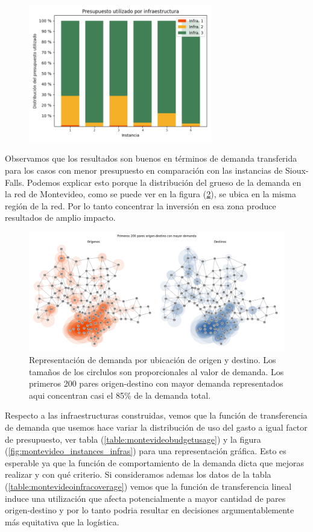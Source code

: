 \documentclass{article}
\begin{document}
  \begin{figure}[h!]
    \centering
    \includegraphics[width=8cm]{../resources/montevideo_budget_usage_by_infra.png}
      \caption{}
    \label{fig:montevideobudgetusage}
  \end{figure}

  Observamos que los resultados son buenos en términos de demanda transferida para los casos con menor presupuesto en comparación con las instancias de Sioux-Falls. Podemos explicar esto porque la distribución del grueso de la demanda en la red de Montevideo, como se puede ver en la figura (\ref{fig:montevideodemanddist}), se ubica en la misma región de la red. Por lo tanto concentrar la inversión en esa zona produce resultados de amplio impacto.

  \begin{figure}[h!]
    \centering
    \includegraphics[width=12cm]{../resources/montevideo_demands.png}
      \caption{Representación de demanda por ubicación de origen y destino. Los tamaños de los circlulos son proporcionales al valor de demanda. Los primeros 200 pares origen-destino con mayor demanda representados aqui concentran casi el 85\% de la demanda total.}
    \label{fig:montevideodemanddist}
  \end{figure}

  Respecto a las infraestructuras construidas, vemos que la función de transferencia de demanda que usemos hace variar la distribución de uso del gasto a igual factor de presupuesto, ver tabla (\ref{table:montevideobudgetusage}) y la figura (\ref{fig:montevideo_instances_infras}) para una representación gráfica. Esto es esperable ya que la función de comportamiento de la demanda dicta que mejoras realizar y con qué criterio. Si consideramos ademas los datos de la tabla (\ref{table:montevideoinfracoverage}) vemos que la función de transferencia lineal induce una utilización que afecta potencialmente a mayor cantidad de pares origen-destino y por lo tanto podria resultar en decisiones argumentablemente más equitativa que la logística.
\end{document}
